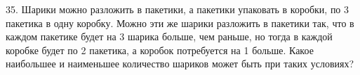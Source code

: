 35. Шарики можно разложить в пакетики, а пакетики упаковать в коробки, по 3 пакетика в одну коробку. Можно эти же шарики разложить в пакетики так, что в каждом пакетике будет на 3 шарика больше, чем раньше, но тогда в каждой коробке будет по 2 пакетика, а коробок потребуется на 1 больше. Какое наибольшее и наименьшее количество шариков может быть при таких условиях?\\
